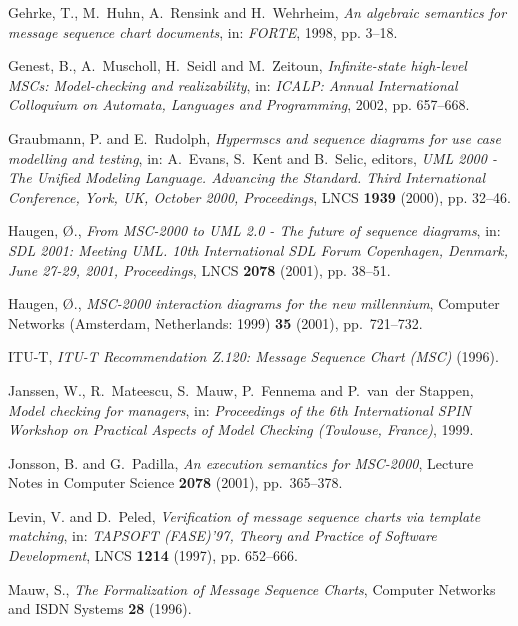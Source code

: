 \documentclass{entcs}
\begin{document}
\begin{thebibliography}{10}
Gehrke, T., M.~Huhn, A.~Rensink and H.~Wehrheim, \emph{An algebraic semantics
  for message sequence chart documents}, in: \emph{{FORTE}}, 1998, pp. 3--18.

Genest, B., A.~Muscholl, H.~Seidl and M.~Zeitoun, \emph{Infinite-state
  high-level {MSC}s: Model-checking and realizability}, in: \emph{ICALP: Annual
  International Colloquium on Automata, Languages and Programming}, 2002, pp.
  657--668.

Graubmann, P. and E.~Rudolph, \emph{Hypermscs and sequence diagrams for use
  case modelling and testing}, in: A.~Evans, S.~Kent and B.~Selic, editors,
  \emph{UML 2000 - The Unified Modeling Language. Advancing the Standard. Third
  International Conference, York, UK, October 2000, Proceedings},  LNCS
  \textbf{1939} (2000), pp. 32--46.

Haugen, {\O}., \emph{From {MSC-2000} to {UML 2.0} - {The} future of sequence
  diagrams}, in: \emph{SDL 2001: Meeting UML. 10th International SDL Forum
  Copenhagen, Denmark, June 27-29, 2001, Proceedings},  LNCS  \textbf{2078}
  (2001), pp. 38--51.

Haugen, {\O}., \emph{{MSC}-2000 interaction diagrams for the new millennium},
  Computer Networks (Amsterdam, Netherlands: 1999) \textbf{35} (2001),
  pp.~721--732.

ITU-T, \emph{{ITU-T Recommendation Z.120: Message Sequence Chart (MSC)}}
  (1996).

Janssen, W., R.~Mateescu, S.~Mauw, P.~Fennema and P.~van~der Stappen,
  \emph{Model checking for managers}, in: \emph{Proceedings of the 6th
  International SPIN Workshop on Practical Aspects of Model Checking (Toulouse,
  France)}, 1999.

Jonsson, B. and G.~Padilla, \emph{An execution semantics for {MSC-2000}},
  Lecture Notes in Computer Science \textbf{2078} (2001), pp.~365--378.

Levin, V. and D.~Peled, \emph{Verification of message sequence charts via
  template matching}, in: \emph{TAPSOFT (FASE)'97, Theory and Practice of
  Software Development},  LNCS  \textbf{1214} (1997), pp. 652--666.

Mauw, S., \emph{{The Formalization of Message Sequence Charts}}, Computer
  Networks and ISDN Systems \textbf{28} (1996).


\end{thebibliography}
\end{document}
